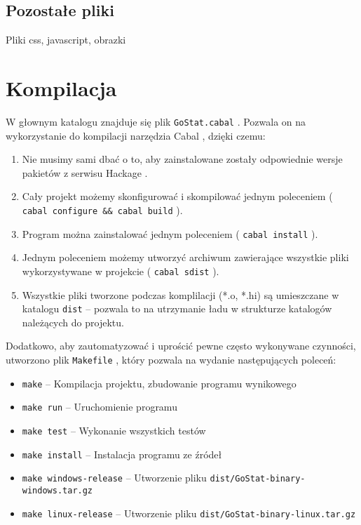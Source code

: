 \documentclass[10pt,leqno]{article}
\newcommand{\cmd}[1]{
  \texttt{#1}
}
\begin{document}
\subsection{Pozostałe pliki}
Pliki css, javascript, obrazki

\section{Kompilacja}

W głownym katalogu znajduje się plik \cmd{GoStat.cabal}. Pozwala on na wykorzystanie do kompilacji 
narzędzia Cabal \cite{cabal}, dzięki czemu:

\begin{enumerate}
\item Nie musimy sami dbać o to, aby zainstalowane zostały odpowiednie wersje pakietów z serwisu
  Hackage \cite{hackage}.
\item Cały projekt możemy skonfigurować i skompilować jednym poleceniem (\cmd{cabal configure \&\& cabal build}).
\item Program można zainstalować jednym poleceniem (\cmd{cabal install}).
\item Jednym poleceniem możemy utworzyć archiwum zawierające wszystkie pliki wykorzystywane w projekcie (\cmd{cabal sdist}).
\item Wszystkie pliki tworzone podczas komplilacji (*.o, *.hi) są umieszczane w katalogu \cmd{dist} -- pozwala
  to na utrzymanie ładu w strukturze katalogów należących do projektu.
\end{enumerate}

\noindent Dodatkowo, aby zautomatyzować i uprościć pewne często wykonywane czynności, utworzono plik \cmd{Makefile}, który
pozwala na wydanie następujących poleceń:

\begin{itemize}

\item \cmd{make} -- Kompilacja projektu, zbudowanie programu wynikowego
\item \cmd{make run} -- Uruchomienie programu
\item \cmd{make test} -- Wykonanie wszystkich testów
\item \cmd{make install} -- Instalacja programu ze źródeł
\item \cmd{make windows-release} -- Utworzenie pliku \cmd{dist/GoStat-binary-windows.tar.gz}
\item \cmd{make linux-release}   -- Utworzenie pliku \cmd{dist/GoStat-binary-linux.tar.gz}
\end{itemize}
\end{document}
